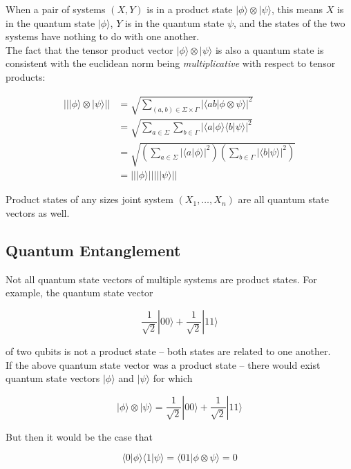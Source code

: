 \documentclass[svgnames]{article}     %
\begin{document}
When a pair of systems $(X,Y)$ is in a product state $|\phi\rangle \otimes |\psi\rangle $, this means $X$ is in the quantum state $|\phi\rangle $, $Y$ is in the quantum state $\psi$, and the states of the two systems have nothing to do with one another. \\

The fact that the tensor product vector $|\phi\rangle \otimes |\psi\rangle $ is also a quantum state is consistent with the euclidean norm being \textit{multiplicative} with respect to tensor products: 

\begin{align*}
  || |\phi\rangle \otimes |\psi\rangle || &= \sqrt{\sum_{(a,b)\in\Sigma\times\Gamma} |\langle ab | \phi\otimes\psi\rangle |^2} \\ &= \sqrt{\sum_{a\in\Sigma}\sum_{b\in\Gamma} | \langle a | \phi\rangle \langle b | \psi \rangle|^2}\\ &= \sqrt{\left(\sum_{a\in\Sigma} | \langle a | \phi\rangle |^2\right)\left(\sum_{b\in\Gamma} | \langle b | \psi\rangle|^2\right)} \\ &= |||\phi\rangle |||||\psi\rangle ||
\end{align*}

Product states of any sizes joint system $(X_1, \hdots , X_n)$ are all quantum state vectors as well. 

\subsection{Quantum Entanglement} 

Not all quantum state vectors of multiple systems are product states. For example, the quantum state vector 

\[
  \frac{1}{\sqrt{2}}|00\rangle + \frac{1}{\sqrt{2}}|11\rangle 
\] \vspace{5px}

of two qubits is not a product state -- both states are related to one another. \\

If the above quantum state vector was a product state -- there would exist quantum state vectors $|\phi\rangle$ and $|\psi\rangle $ for which 

\[
  |\phi\rangle \otimes |\psi\rangle = \frac{1}{\sqrt{2}}|00\rangle + \frac{1}{\sqrt{2}}|11\rangle 
\] \vspace{5px}

But then it would be the case that 

\[
\langle 0 | \phi \rangle \langle 1 | \psi\rangle = \langle 01 | \phi\otimes\psi\rangle = 0
\] \vspace{5px}
\end{document}
